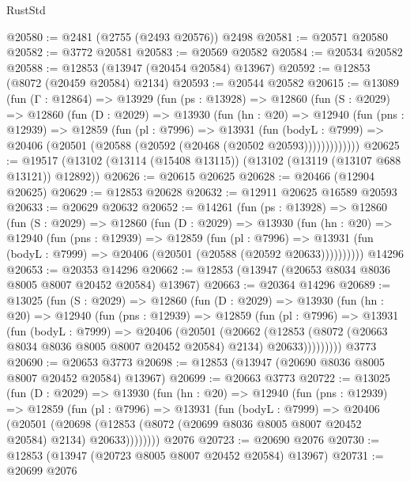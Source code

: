 \begin{lexlean}{RustStd}
\begin{coremodule}
@20580 := @2481 (@2755 (@2493 @20576)) @2498
@20581 := @20571 @20580
@20582 := @3772 @20581
@20583 := @20569 @20582
@20584 := @20534 @20582
@20588 := @12853 (@13947 (@20454 @20584) @13967)
@20592 := @12853 (@8072 (@20459 @20584) @2134)
@20593 := @20544 @20582
@20615 := @13089
    (fun (Γ : @12864) =>
    @13929
      (fun (ps : @13928) =>
      @12860
        (fun (S : @2029) =>
        @12860
          (fun (D : @2029) =>
          @13930
            (fun (hn : @20) =>
            @12940
              (fun (pns : @12939) =>
              @12859
                (fun (pl : @7996) =>
                @13931
                  (fun (bodyL : @7999) =>
                  @20406 (@20501 (@20588 (@20592 (@20468 (@20502 @20593)))))))))))))
@20625 := @19517 (@13102 (@13114 (@15408 @13115)) (@13102 (@13119 (@13107 @688 @13121)) @12892))
@20626 := @20615 @20625
@20628 := @20466 (@12904 @20625)
@20629 := @12853 @20628
@20632 := @12911 @20625 @16589 @20593
@20633 := @20629 @20632
@20652 := @14261
    (fun (ps : @13928) =>
    @12860
      (fun (S : @2029) =>
      @12860
        (fun (D : @2029) =>
        @13930
          (fun (hn : @20) =>
          @12940
            (fun (pns : @12939) =>
            @12859
              (fun (pl : @7996) =>
              @13931 (fun (bodyL : @7999) => @20406 (@20501 (@20588 (@20592 @20633))))))))))
    @14296
@20653 := @20353 @14296
@20662 := @12853 (@13947 (@20653 @8034 @8036 @8005 @8007 @20452 @20584) @13967)
@20663 := @20364 @14296
@20689 := @13025
    (fun (S : @2029) =>
    @12860
      (fun (D : @2029) =>
      @13930
        (fun (hn : @20) =>
        @12940
          (fun (pns : @12939) =>
          @12859
            (fun (pl : @7996) =>
            @13931
              (fun (bodyL : @7999) =>
              @20406
                (@20501
                  (@20662
                    (@12853
                      (@8072 (@20663 @8034 @8036 @8005 @8007 @20452 @20584) @2134)
                      @20633)))))))))
    @3773
@20690 := @20653 @3773
@20698 := @12853 (@13947 (@20690 @8036 @8005 @8007 @20452 @20584) @13967)
@20699 := @20663 @3773
@20722 := @13025
    (fun (D : @2029) =>
    @13930
      (fun (hn : @20) =>
      @12940
        (fun (pns : @12939) =>
        @12859
          (fun (pl : @7996) =>
          @13931
            (fun (bodyL : @7999) =>
            @20406
              (@20501
                (@20698
                  (@12853 (@8072 (@20699 @8036 @8005 @8007 @20452 @20584) @2134) @20633))))))))
    @2076
@20723 := @20690 @2076
@20730 := @12853 (@13947 (@20723 @8005 @8007 @20452 @20584) @13967)
@20731 := @20699 @2076

\end{coremodule}
\end{lexlean}

